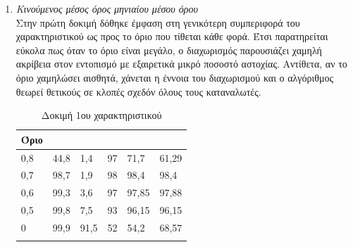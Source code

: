 \begin{enumerate}
\item{\textit{Κινούμενος μέσος όρος μηνιαίου μέσου όρου}} \\
Στην πρώτη δοκιμή δόθηκε έμφαση στη γενικότερη συμπεριφορά του χαρακτηριστικού ως προς το όριο που τίθεται κάθε φορά. Έτσι παρατηρείται εύκολα πως όταν το όριο είναι μεγάλο, ο διαχωρισμός παρουσιάζει χαμηλή ακρίβεια στον εντοπισμό με εξαιρετικά μικρό ποσοστό αστοχίας. Αντίθετα, αν το όριο χαμηλώσει αισθητά, χάνεται η έννοια του διαχωρισμού και ο αλγόριθμος θεωρεί θετικούς σε κλοπές σχεδόν όλους τους καταναλωτές.
\begin{center}
\begin{longtabu}  to 0.8\textwidth { | X[c] || X[c] | X[c] | X[c] | X[c] | X[c] |  }
 \hline
  Όριο &   &  &  &  & \\
 ,8&	44,8&	1,4	&97	&71,7&	61,29\\
0,7&	98,7&	1,9	&98	&98,4&	98,4\\
0,6&	99,3&	3,6&	97&	97,85&	97,88\\
0,5&	99,8&	7,5	&93	&96,15&	96,15\\
0&	99,9&	91,5	&52	&54,2&	68,57\\
\hline
\caption{Δοκιμή 1ου χαρακτηριστικού}
\label{testfeat1}
\end{longtabu}
\end{center}


\end{enumerate}
